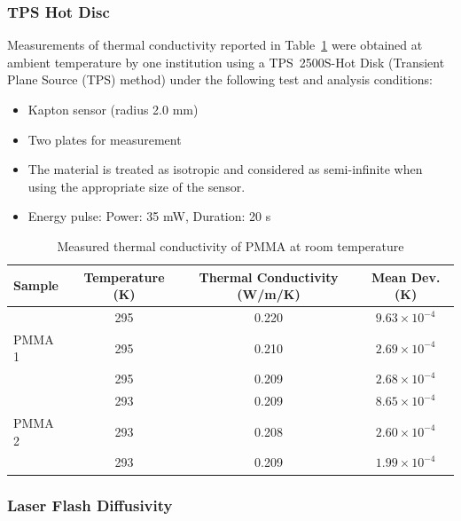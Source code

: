 \documentclass{book}
\begin{document}
\subsubsection{TPS Hot Disc}

Measurements of thermal conductivity reported in Table~\ref{Table_14} were obtained at ambient temperature by one institution using a TPS~2500S-Hot Disk (Transient Plane Source (TPS) method) under the following test and analysis conditions:
\begin{itemize}
 \item Kapton sensor (radius 2.0 mm)
 \item Two plates for measurement
 \item The material is treated as isotropic and considered as semi-infinite when using the appropriate size of the sensor.
 \item Energy pulse: Power: 35 mW, Duration: 20 s
\end{itemize}

\begin{table}[ht]
\caption{Measured thermal conductivity of PMMA at room temperature}
\label{Table_14}
\begin{center}
\begin{tabular}{|l|ccc|}
\hline
Sample    & Temperature (K) & Thermal Conductivity (W/m/K) & Mean Dev. (K)        \\ \hline
          & 295             & 0.220                        & $9.63\times10^{-4}$  \\
PMMA 1    & 295             & 0.210                        & $2.69\times10^{-4}$  \\
          & 295             & 0.209                        & $2.68\times10^{-4}$  \\ \hline & 293             & 0.209                        & $8.65\times10^{-4}$  \\
PMMA 2    & 293             & 0.208                        & $2.60\times10^{-4}$  \\
          & 293             & 0.209                        & $1.99\times10^{-4}$  \\ \hline
\end{tabular}
\end{center}
\end{table}


\subsubsection{Laser Flash Diffusivity}
\end{document}
